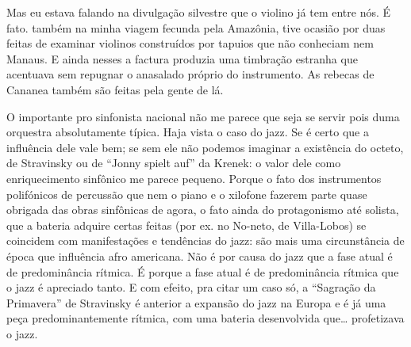 Mas eu estava falando na divulgação silvestre que o violino já tem entre
nós. É fato. também na minha viagem fecunda pela Amazônia, tive ocasião
por duas feitas de examinar violinos construídos por tapuios que não
conheciam nem Manaus. E ainda nesses a factura produzia uma timbração
estranha que acentuava sem repugnar o anasalado próprio do instrumento.
As rebecas de Cananea também são feitas pela gente de lá.

O importante pro sinfonista nacional não me parece que seja se servir
pois duma orquestra absolutamente típica. Haja vista o caso do jazz. Se
é certo que a influência dele vale bem; se sem ele não podemos imaginar
a existência do octeto, de Stravinsky ou de ``Jonny spielt auf'' da
Krenek: o valor dele como enriquecimento sinfônico me parece pequeno.
Porque o fato dos instrumentos polifónicos de percussão que nem o piano
e o xilofone fazerem parte quase obrigada das obras sinfônicas de agora,
o fato ainda do protagonismo até solista, que a bateria adquire certas
feitas (por ex. no No-neto, de Villa-Lobos) se coincidem com
manifestações e tendências do jazz: são mais uma circunstância de época
que influência afro americana. Não é por causa do jazz que a fase atual
é de predominância rítmica. É porque a fase atual é de predominância
rítmica que o jazz é apreciado tanto. E com efeito, pra citar um caso
só, a ``Sagração da Primavera'' de Stravinsky é anterior a expansão do
jazz na Europa e é já uma peça predominantemente rítmica, com uma
bateria desenvolvida que\ldots{} profetizava o jazz.


